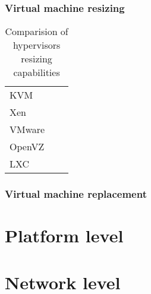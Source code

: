 \subsubsection*{Virtual machine resizing}



\begin{table}[!htbp]
\begin{tabularx}{\textwidth}{l | X | X}
 &  & \\
\hline 
KVM &  & \\
\hline
Xen &  & \\
\hline
VMware &  & \\
\hline
OpenVZ &  & \\
\hline
LXC &  &  \\
\end{tabularx}
\caption{Comparision of hypervisors resizing capabilities}
\label{tab:hypervisors-resizing}
\end{table}

\subsubsection*{Virtual machine replacement}

\section{Platform level}

\section{Network level}
